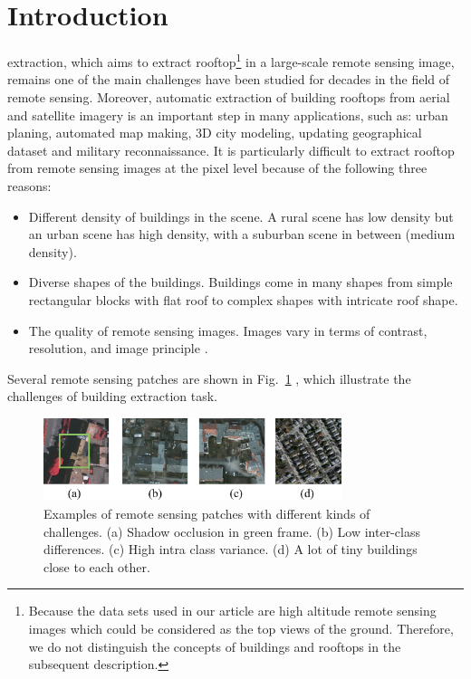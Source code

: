 %
\section{Introduction}
\label{sec:intro}



 extraction, which aims to extract rooftop\footnote{Because the data sets used in our article are high altitude remote sensing images which could be considered as the top views of the ground. Therefore, we do not distinguish the concepts of buildings and rooftops in the subsequent description.} in a large-scale remote sensing image, remains one of the main challenges have been studied for decades in the field of remote sensing. Moreover, automatic extraction of building rooftops from aerial and satellite imagery is an important step in many applications, such as: urban planing, automated map making, 3D city modeling, updating geographical dataset and military reconnaissance. It is particularly difficult to extract rooftop from remote sensing images at the pixel level because of the following three reasons: 
\begin{itemize}
 \item Different density of buildings in the scene. A rural scene has low density but an urban scene has high density, with a suburban scene in between (medium density). 
 \item Diverse shapes of the buildings. Buildings come in many shapes from simple rectangular blocks with flat roof to complex shapes with intricate roof shape. 
 \item The quality of remote sensing images. Images vary in terms of contrast, resolution, and image principle \cite{IEEEexample:huertas1988detecting}.  
\end{itemize} 
 
 Several remote sensing patches are shown in Fig.~\ref{fig:intro}  , which illustrate the challenges of building extraction task.


\begin{figure}
\includegraphics[width=8.7cm]{Figures/challenge.eps}
\caption{Examples of remote sensing patches with different kinds of challenges. (a) Shadow occlusion in green frame. (b) Low inter-class differences. (c) High intra class variance. (d) A lot of tiny buildings close to each other.}
\label{fig:intro}
\end{figure}


